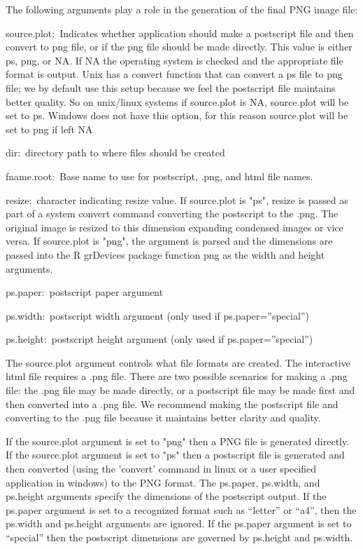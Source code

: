 \documentclass[]{article}
\begin{document}
The following arguments play a role in the generation of the final PNG image file:
\begin{description}
  \item{source.plot:~}{Indicates whether application should make a
    postscript file and then convert to png file, or if the png file
    should be made directly. This value is either ps, png, or NA. If NA
    the operating system is checked and the appropriate file format is
    output. Unix has a convert function that can convert a ps file to
    png file; we by default use this setup because we feel the
    postscript file maintains better quality. So on unix/linux systems
    if source.plot is NA, source.plot will be set to ps. Windows does
    not have this option, for this reason source.plot will be set to png
    if left NA}

  \item{dir:~}{directory path to where files should be created}
  \item{fname.root:~}{Base name to use for postscript, .png, and html
    file names.}

  \item{resize:~}{character indicating resize value. If source.plot is "ps", resize is passed as part of a system convert command converting the postscript to the .png. The original image is resized to this dimension expanding condensed images or vice versa. If source.plot is "png", the argument is parsed and the dimensions are passed into the R grDevices package function png as the width and height arguments.}
  \item{ps.paper:~}{postscript paper argument}
  \item{ps.width:~}{postscript width argument (only used if ps.paper=''special'')}
  \item{ps.height:~}{postscript height argument (only used if ps.paper=''special'')}


\end{description}
The source.plot argument controls what file formats are created. The interactive html file requires a .png file. There are two possible scenarios for making a .png file: the .png file may be made directly, or a postscript file may be made first and then converted into a .png file. We recommend making the postscript file and converting to the .png file because it maintains better clarity and quality.


\indent If the source.plot argument is set to "png" then a PNG file is generated directly. If the source.plot argument is set to "ps" then a postscript file is generated and then converted (using the 'convert' command in linux or a user specified application in windows) to the PNG format. The ps.paper, ps.width, and ps.height arguments specify the dimensions of the postscript output. If the ps.paper argument is set to a recognized format such as ``letter'' or ``a4'', then the ps.width and ps.height arguments are ignored. If the ps.paper argument is set to ``special'' then the postscript dimensions are governed by ps.height and ps.width. 
\end{document}
